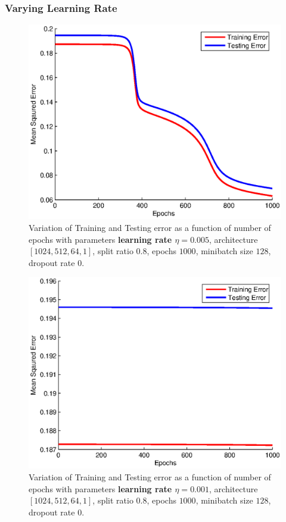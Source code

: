 \documentclass{article}
\newcommand{\myScale}{0.56}
\begin{document}
\subsubsection{Varying Learning Rate}
\begin{figure}[H]
\includegraphics[scale=\myScale]{../q2/part4_0p005}
\caption{Variation of Training and Testing error as a function of number of epochs with parameters {\bf learning rate $\eta=0.005$}, architecture $[1024,512,64,1]$, split ratio $0.8$, epochs $1000$, minibatch size $128$, dropout rate $0$.}
\label{fig:fig20}
\end{figure}
\begin{figure}[H]
\includegraphics[scale=\myScale]{../q2/part4_0p001}
\caption{Variation of Training and Testing error as a function of number of epochs with parameters {\bf learning rate $\eta=0.001$}, architecture $[1024,512,64,1]$, split ratio $0.8$, epochs $1000$, minibatch size $128$, dropout rate $0$.}
\label{fig:fig21}
\end{figure}
\end{document}
